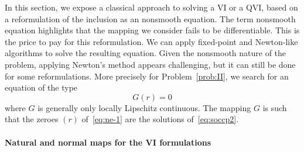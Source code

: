 {In this section, we expose a classical approach to solving a VI or a QVI, based on a reformulation of the inclusion as an nonsmooth equation.
The term nonsmooth equation highlights that the mapping we consider fails to be differentiable.
This is the price to pay for this reformulation. We can apply fixed-point and Newton-like algorithms to solve the resulting equation.
Given the nonsmooth nature of the problem, applying Newton's method appears challenging, but it can still be done for some reformulations.
%
More precisely for Problem~\ref{prob:II}, we search for an equation of the type
\begin{equation}
  \label{eq:ne-1}
  G(r) = 0
\end{equation}
where $G$ is generally {only} locally Lipschitz continuous. The mapping $G$ is such that the zeroes $(r)$ of~\eqref{eq:ne-1} are the solutions of~\eqref{eq:soccp2}.

\paragraph{Natural and normal maps for the VI formulations}

}
